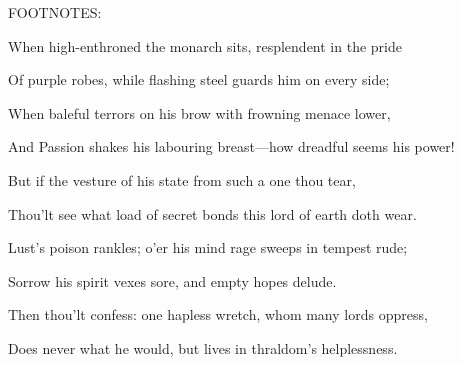 FOOTNOTES:


When high-enthroned the monarch sits, resplendent in the pride

Of purple robes, while flashing steel guards him on every side;

When baleful terrors on his brow with frowning menace lower,

And Passion shakes his labouring breast—how dreadful seems his power!

But if the vesture of his state from such a one thou tear,

Thou'lt see what load of secret bonds this lord of earth doth wear.

Lust's poison rankles; o'er his mind rage sweeps in tempest rude;

Sorrow his spirit vexes sore, and empty hopes delude.

Then thou'lt confess: one hapless wretch, whom many lords oppress,

Does never what he would, but lives in thraldom's helplessness.


